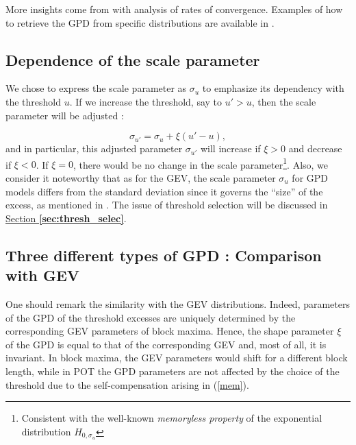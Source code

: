 More insights come from \citet[pp.27-28]{reiss_statistical_2007} with analysis of rates of convergence. Examples of how to retrieve the GPD from specific distributions are available in \citet[pp.77]{coles_introduction_2001}.


\subsection{Dependence of the scale parameter } We chose to express the scale parameter as $\sigma_u$ to emphasize its dependency with the threshold $u$. If we increase the threshold, say to $u'>u$, then the scale parameter will be adjusted :

\begin{equation} \label{mem}
\sigma_{u'}=\sigma_u+\xi (u'-u),
\end{equation}
and in particular, this adjusted parameter $\sigma_{u'}$ will increase if $\xi>0$ and decrease if $\xi<0$.
If $\xi =0$, there would be no change in the scale parameter\footnote{Consistent with the well-known \emph{memoryless property} of the exponential distribution $H_{0,\sigma_u}$}. 
Also, we consider it noteworthy that as for the GEV, the scale parameter $\sigma_u$ for GPD models
differs from the standard deviation since it governs the “size” of the excess, as mentioned in \citet[pp.20]{AghaKouchak_extremes_2013}.
The issue of threshold selection will be discussed in \hyperref[sec:thresh_selec]{Section \textbf{\ref{sec:thresh_selec}}}.



\subsection{Three different types of GPD : Comparison with GEV} 
One should remark the similarity with the GEV distributions. Indeed, parameters of the GPD of the threshold excesses are uniquely determined by the corresponding GEV parameters of block maxima. Hence, the shape parameter $\xi$ of the GPD is equal to that of the corresponding GEV and, most of all, it is invariant.
In block maxima, the GEV parameters would shift for a different block length, while in POT the GPD parameters are not affected by the choice of the threshold due to the self-compensation arising in (\ref{mem}).%

